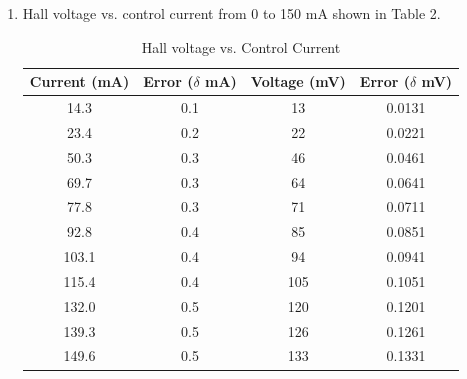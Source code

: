 \begin{enumerate}[resume]
\item Hall voltage vs. control current from 0 to 150 mA shown in Table 2.
  \begin{table}[h]
    \center
    \begin{tabular}{|c|c|c|c|}
      \hline
      Current (mA) & Error ($\delta$ mA) & Voltage (mV) & Error ($\delta$ mV)\\
      \hline
      14.3&0.1&13&0.0131\\
      23.4&0.2&22&0.0221\\
      50.3&0.3&46&0.0461\\
      69.7&0.3&64&0.0641\\
      77.8&0.3&71&0.0711\\
      92.8&0.4&85&0.0851\\
      103.1&0.4&94&0.0941\\
      115.4&0.4&105&0.1051\\
      132.0&0.5&120&0.1201\\
      139.3&0.5&126&0.1261\\
      149.6&0.5&133&0.1331\\
      \hline
    \end{tabular}
    \label{tbl:HMTable2}
    \caption{Hall voltage vs. Control Current}
  \end{table}
  

\end{enumerate}
